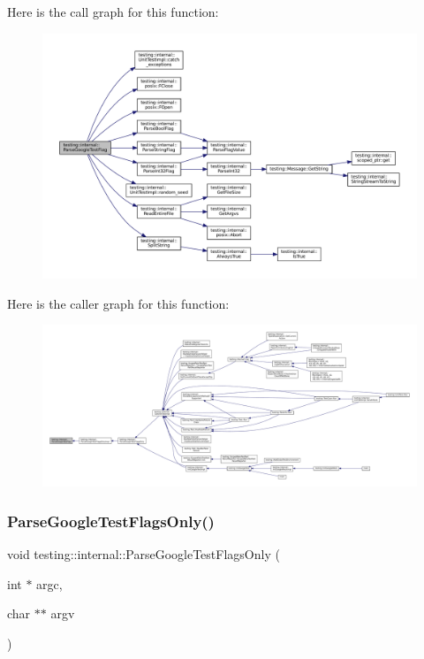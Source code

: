 Here is the call graph for this function\+:
\nopagebreak
\begin{figure}[H]
\begin{center}
\leavevmode
\includegraphics[width=350pt]{namespacetesting_1_1internal_afccff08aa2b1ede0dd32c1364a5dee42_cgraph}
\end{center}
\end{figure}
Here is the caller graph for this function\+:
\nopagebreak
\begin{figure}[H]
\begin{center}
\leavevmode
\includegraphics[width=350pt]{namespacetesting_1_1internal_afccff08aa2b1ede0dd32c1364a5dee42_icgraph}
\end{center}
\end{figure}
\mbox{\label{namespacetesting_1_1internal_a472880afbcc592a41e3d623e2dec8412}} 
\subsubsection{\texorpdfstring{Parse\+Google\+Test\+Flags\+Only()}{ParseGoogleTestFlagsOnly()}\hspace{0.1cm}{\footnotesize\ttfamily [1/2]}}
{\footnotesize\ttfamily void testing\+::internal\+::\+Parse\+Google\+Test\+Flags\+Only (\begin{DoxyParamCaption}\item[{int $\ast$}]{argc,  }\item[{char $\ast$$\ast$}]{argv }\end{DoxyParamCaption})}



